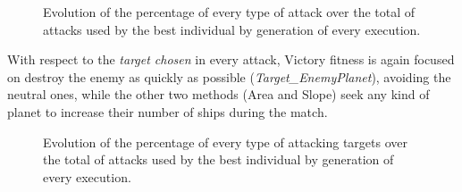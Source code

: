 \documentclass[preprint]{elsarticle}
\begin{document}
  \begin{figure}[ht]
  \begin{center}
  \end{center}
  \caption{Evolution of the percentage of every type of attack over the total of attacks used by the best individual by generation of every execution.
  }
  \label{figura:e_attacks}
  \end{figure}

With respect to the {\em target chosen} in every attack, Victory fitness is again focused on destroy the enemy as quickly as possible (\emph{Target\_EnemyPlanet}), avoiding the neutral ones, while the other two methods (Area and Slope) seek any kind of planet to increase their number of ships during the match.

   \begin{figure}[ht]
  \begin{center}
  \end{center}
  \caption{Evolution of the percentage of every type of attacking targets over the total of attacks used by the best individual by generation of every execution.
  }
  \label{figura:e_targets}
  \end{figure}
\end{document}
